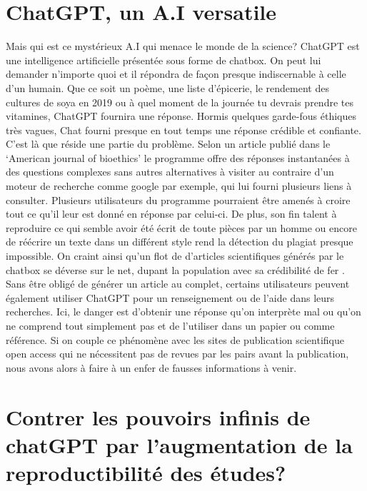 \documentclass[preprint, 3p,
authoryear]{elsarticle} %
\begin{document}
\hypertarget{chatgpt-un-a.i-versatile}{%
\section{\texorpdfstring{\textbf{ChatGPT, un A.I
versatile}}{ChatGPT, un A.I versatile}}\label{chatgpt-un-a.i-versatile}}

Mais qui est ce mystérieux A.I qui menace le monde de la science?
ChatGPT est une intelligence artificielle présentée sous forme de
chatbox. On peut lui demander n'importe quoi et il répondra de façon
presque indiscernable à celle d'un humain. Que ce soit un poème, une
liste d'épicerie, le rendement des cultures de soya en 2019 ou à quel
moment de la journée tu devrais prendre tes vitamines, ChatGPT fournira
une réponse. Hormis quelques garde-fous éthiques très vagues, Chat
fourni presque en tout temps une réponse crédible et confiante. C'est là
que réside une partie du problème. Selon un article publié dans le
`American journal of bioethics' le programme offre des réponses
instantanées à des questions complexes sans autres alternatives à
visiter au contraire d'un moteur de recherche comme google par exemple,
qui lui fourni plusieurs liens à consulter.\citep{doshi_chatgpt_2023}
Plusieurs utilisateurs du programme pourraient être amenés à croire tout
ce qu'il leur est donné en réponse par celui-ci. De plus, son fin talent
à reproduire ce qui semble avoir été écrit de toute pièces par un homme
ou encore de réécrire un texte dans un différent style rend la détection
du plagiat presque impossible. On craint ainsi qu'un flot de d'articles
scientifiques générés par le chatbox se déverse sur le net, dupant la
population avec sa crédibilité de fer \citep{noauthor_ai_nodate}. Sans
être obligé de générer un article au complet, certains utilisateurs
peuvent également utiliser ChatGPT pour un renseignement ou de l'aide
dans leurs recherches. Ici, le danger est d'obtenir une réponse qu'on
interprète mal ou qu'on ne comprend tout simplement pas et de l'utiliser
dans un papier ou comme référence. Si on couple ce phénomène avec les
sites de publication scientifique open access qui ne nécessitent pas de
revues par les pairs avant la publication, nous avons alors à faire à un
enfer de fausses informations à venir.

\hypertarget{contrer-les-pouvoirs-infinis-de-chatgpt-par-laugmentation-de-la-reproductibilituxe9-des-uxe9tudes}{%
\section{\texorpdfstring{\textbf{Contrer les pouvoirs infinis de chatGPT
par l'augmentation de la reproductibilité des
études?}}{Contrer les pouvoirs infinis de chatGPT par l'augmentation de la reproductibilité des études?}}\label{contrer-les-pouvoirs-infinis-de-chatgpt-par-laugmentation-de-la-reproductibilituxe9-des-uxe9tudes}}
\end{document}
